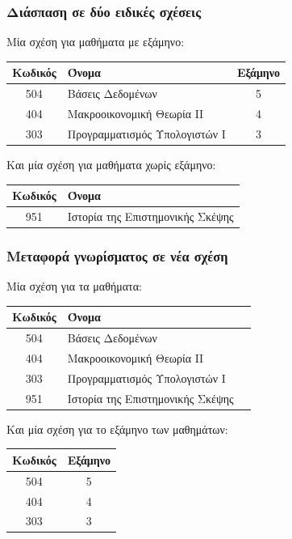 \begin{frame}[t, fragile]
\frametitle{Διάσπαση σε δύο ειδικές σχέσεις}
\begin{minipage}{\wE} 
  \par {\color{red} Μία σχέση για μαθήματα με εξάμηνο:} \\
  \begin{tabular}{ c l c } \toprule
    {\bf Κωδικός} & {\bf Όνομα} & {\bf Εξάμηνο} \\ \midrule 
    504 & Βάσεις Δεδομένων & 5 \\ 
    404 & Μακροοικονομική Θεωρία ΙΙ & 4 \\  
    303 & Προγραμματισμός Υπολογιστών Ι & 3 \\  \bottomrule
  \end{tabular}
  \bigskip
  \par {\color{red} Και μία σχέση για μαθήματα χωρίς εξάμηνο:} \\
  \begin{tabular}{ c l } \toprule
    {\bf Κωδικός} & {\bf Όνομα}  \\ \midrule 
    951 & Ιστορία της Επιστημονικής Σκέψης \\  \bottomrule
  \end{tabular}  
\end{minipage}  
\end{frame}


\begin{frame}[t, fragile]
\frametitle{Μεταφορά γνωρίσματος σε νέα σχέση}
\begin{minipage}{\wE}
 
  \par {\color{red} Μία σχέση για τα μαθήματα:} \\
  \begin{tabular}{ c l c } \toprule
    {\bf Κωδικός} & {\bf Όνομα}  \\ \midrule 
    504 & Βάσεις Δεδομένων  \\ 
    404 & Μακροοικονομική Θεωρία ΙΙ  \\  
    303 & Προγραμματισμός Υπολογιστών Ι  \\
    951 & Ιστορία της Επιστημονικής Σκέψης \\ \bottomrule
  \end{tabular}
  \bigskip
  \par {\color{red} Και μία σχέση για το εξάμηνο των μαθημάτων:} \\
  \begin{tabular}{ c c } \toprule
    {\bf Κωδικός} & {\bf Εξάμηνο}  \\ \midrule 
    504 & 5 \\
    404 & 4 \\
    303 & 3 \\ \bottomrule
  \end{tabular}  
\end{minipage}  
\end{frame}
